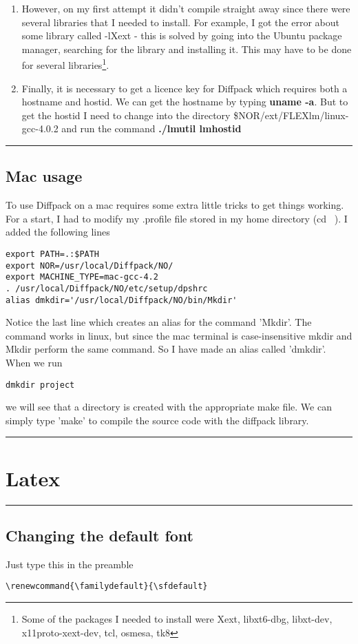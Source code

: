 \documentclass[a4paper, 10pt]{article}
\renewcommand{\familydefault}{\sfdefault}
\newcommand{\mytoprule}{\hrule\vspace{4mm}}
\newcommand{\mybotrule}{\vspace{4mm}\hrule}
\begin{document}
\begin{enumerate}
\item However, on my first attempt it didn't compile straight away since there were several libraries that I needed to install. For example, I got the error about some library called -lXext - this is solved by going into the Ubuntu package manager, searching for the library and installing it. This may have to be done for several libraries\footnote{Some of the packages I needed to install were Xext, libxt6-dbg, libxt-dev, x11proto-xext-dev, tcl, osmesa, tk8}.
\item Finally, it is necessary to get a licence key for Diffpack which requires both a hostname and hostid. We can get the hostname by typing {\bf uname -a}. But to get the hostid I need to change into the directory \$NOR/ext/FLEXlm/linux-gcc-4.0.2 and run the command {\bf ./lmutil lmhostid}
\end{enumerate}

\mytoprule
\subsection*{Mac usage}

To use Diffpack on a mac requires some extra little tricks to get things working. For a start, I had to modify my .profile file stored in my home directory (cd ~). I added the following lines
\begin{verbatim}
export PATH=.:$PATH
export NOR=/usr/local/Diffpack/NO/
export MACHINE_TYPE=mac-gcc-4.2
. /usr/local/Diffpack/NO/etc/setup/dpshrc
alias dmkdir='/usr/local/Diffpack/NO/bin/Mkdir'
\end{verbatim}
Notice the last line which creates an alias for the command 'Mkdir'. The command works in linux, but since the mac terminal is case-insensitive mkdir and Mkdir perform the same command. So I have made an alias called 'dmkdir'. When we run 
\begin{verbatim}
dmkdir project
\end{verbatim}
we will see that a directory is created with the appropriate make file. We can simply type 'make' to compile the source code with the diffpack library.
\mybotrule


\vspace{10mm}
\section*{Latex}

\mytoprule
\subsection*{Changing the default font}
Just type this in the preamble
\begin{Verbatim}
\renewcommand{\familydefault}{\sfdefault}
\end{Verbatim}
\end{document}
